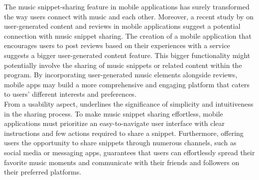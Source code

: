 The music snippet-sharing feature in mobile applications has surely transformed the way users connect with music and each other. Moreover, a recent study by \textcite{abdulrahman22} on user-generated content and reviews in mobile applications suggest a potential connection with music snippet sharing. The creation of a mobile application that encourages users to post reviews based on their experiences with a service suggests a bigger user-generated content feature. This bigger functionality might potentially involve the sharing of music snippets or related content within the program. By incorporating user-generated music elements alongside reviews, mobile apps may build a more comprehensive and engaging platform that caters to users' different interests and preferences. \\

From a usability aspect, \textcite{weichbroth20} underlines the significance of simplicity and intuitiveness in the sharing process. To make music snippet sharing effortless, mobile applications must prioritize an easy-to-navigate user interface with clear instructions and few actions required to share a snippet. Furthermore, offering users the opportunity to share snippets through numerous channels, such as social media or messaging apps, guarantees that users can effortlessly spread their favorite music moments and communicate with their friends and followers on their preferred platforms. \pagebreak

